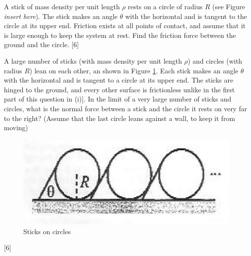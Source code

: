 \begin{problem}
    \begin{subproblem}
        A stick of mass density per unit length $\rho$ rests on a circle of radius $R$ (see Figure \textit{insert here}). The stick makes an angle $\theta$ with the horizontal and is tangent to the circle at its upper end. Friction exists at all points of contact, and assume that it is large enough to keep the system at rest. Find the friction force between the ground and the circle.
    \hfill{[6]}\end{subproblem}

    \begin{subproblem}
        A large number of sticks (with mass density per unit length $\rho$) and circles (with radius $R$) lean on each other, an shown in Figure \ref{2011q5}. Each stick makes an angle $\theta$ with the horizontal and is tangent to a circle at its upper end. The sticks are hinged to the ground, and every other surface is frictionless unlike in the first part of this question in (i)]. In the limit of a very large number of sticks and circles, what is the normal force between a stick and the circle it rests on very far to the right? (Assume that the last circle leans against a wall, to keep it from moving)
        \begin{figure}[h]
	        \centering
	        \includegraphics[width=0.7\linewidth]{spho_book_TYS_images/2011q5.png}
	        \caption{Sticks on circles}\label{2011q5}
        \end{figure}
    \hfill{[6]}\end{subproblem}
\end{problem}

